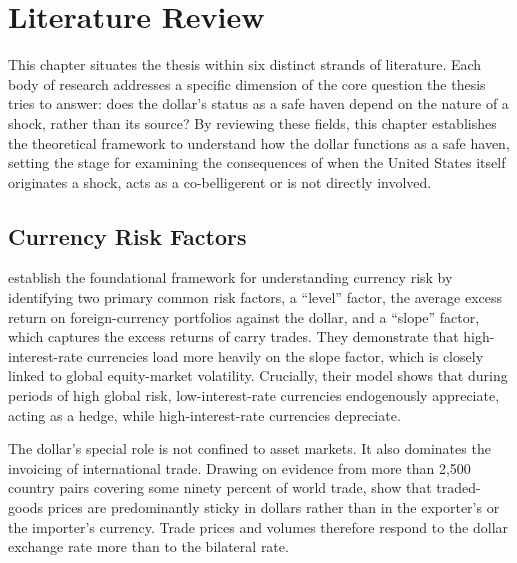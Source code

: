 
\chapter{Literature Review}
\label{ch:literature}

This chapter situates the thesis within six distinct strands of literature. Each body of research addresses a specific dimension of the core question the thesis tries to answer: does the dollar's status as a safe haven depend on the nature of a shock, rather than its source? By reviewing these fields, this chapter establishes the theoretical framework to understand how the dollar functions as a safe haven, setting the stage for examining the consequences of when the United States itself originates a shock, acts as a co-belligerent or is not directly involved.

\section{Currency Risk Factors}
\label{sec:lit_factors}

\textcite{lustig_roussanov_verdelhan_2011} establish the foundational framework for understanding currency risk by identifying two primary common risk factors, a ``level'' factor, the average excess return on foreign-currency portfolios against the dollar, and a ``slope'' factor, which captures the excess returns of carry trades. They demonstrate that high-interest-rate currencies load more heavily on the slope factor, which is closely linked to global equity-market volatility. Crucially, their model shows that during periods of high global risk, low-interest-rate currencies endogenously appreciate, acting as a hedge, while high-interest-rate currencies depreciate.

The dollar's special role is not confined to asset markets. It also dominates the invoicing of international trade. Drawing on evidence from more than 2,500 country pairs covering some ninety percent of world trade, \textcite{gopinath_boz_casas_diez_gourinchas_plagborgmoller_2020} show that traded-goods prices are predominantly sticky in dollars rather than in the exporter's or the importer's currency. Trade prices and volumes therefore respond to the dollar exchange rate more than to the bilateral rate.


